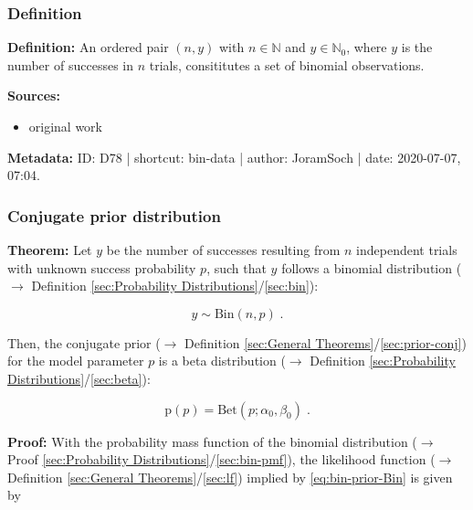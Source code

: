 \documentclass[a4paper,12pt,twoside]{book}
\begin{document}
\subsubsection[\textit{Definition}]{Definition} \label{sec:bin-data}
\setcounter{equation}{0}

\textbf{Definition:} An ordered pair $(n,y)$ with $n \in \mathbb{N}$ and $y \in \mathbb{N}_0$, where $y$ is the number of successes in $n$ trials, consititutes a set of binomial observations.


\vspace{1em}
\textbf{Sources:}
\begin{itemize}
\item original work\end{itemize}


\vspace{1em}
\textbf{Metadata:} ID: D78 | shortcut: bin-data | author: JoramSoch | date: 2020-07-07, 07:04.
\vspace{1em}



\subsubsection[\textbf{Conjugate prior distribution}]{Conjugate prior distribution} \label{sec:bin-prior}
\setcounter{equation}{0}

\textbf{Theorem:} Let $y$ be the number of successes resulting from $n$ independent trials with unknown success probability $p$, such that $y$ follows a binomial distribution ($\rightarrow$ Definition \ref{sec:Probability Distributions}/\ref{sec:bin}):

\begin{equation} \label{eq:bin-prior-Bin}
y \sim \mathrm{Bin}(n,p) \; .
\end{equation}

Then, the conjugate prior ($\rightarrow$ Definition \ref{sec:General Theorems}/\ref{sec:prior-conj}) for the model parameter $p$ is a beta distribution ($\rightarrow$ Definition \ref{sec:Probability Distributions}/\ref{sec:beta}):

\begin{equation} \label{eq:bin-prior-Beta}
\mathrm{p}(p) = \mathrm{Bet}(p; \alpha_0, \beta_0) \; .
\end{equation}


\vspace{1em}
\textbf{Proof:} With the probability mass function of the binomial distribution ($\rightarrow$ Proof \ref{sec:Probability Distributions}/\ref{sec:bin-pmf}), the likelihood function ($\rightarrow$ Definition \ref{sec:General Theorems}/\ref{sec:lf}) implied by \eqref{eq:bin-prior-Bin} is given by
\end{document}
